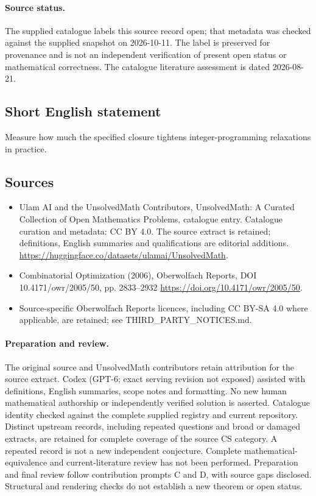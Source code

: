 \documentclass[11pt]{article}
\begin{document}
\paragraph{Source status.}
The supplied catalogue labels this source record open; that metadata was checked against the supplied snapshot on 2026-10-11. The label is preserved for provenance and is not an independent verification of present open status or mathematical correctness. The catalogue literature assessment is dated 2026-08-21.
\subsection{Short English statement}
Measure how much the specified closure tightens integer-programming relaxations in practice.
\subsection{Sources}
\begin{itemize}
\item[S1] Ulam AI and the UnsolvedMath Contributors, UnsolvedMath: A Curated Collection of Open Mathematics Problems, catalogue entry. Catalogue curation and metadata: CC BY 4.0. The source extract is retained; definitions, English summaries and qualifications are editorial additions.
\url{https://huggingface.co/datasets/ulamai/UnsolvedMath}.
\item[S2] Combinatorial Optimization (2006), Oberwolfach Reports, DOI 10.4171/owr/2005/50, pp. 2833--2932
\url{https://doi.org/10.4171/owr/2005/50}.
\item Source-specific Oberwolfach Reports licences, including CC BY-SA 4.0 where applicable, are retained; see THIRD\_PARTY\_NOTICES.md.
\end{itemize}
\paragraph{Preparation and review.}
The original source and UnsolvedMath contributors retain attribution for the source extract. Codex (GPT-6; exact serving revision not exposed) assisted with definitions, English summaries, scope notes and formatting. No new human mathematical authorship or independently verified solution is asserted. Catalogue identity checked against the complete supplied registry and current repository. Distinct upstream records, including repeated questions and broad or damaged extracts, are retained for complete coverage of the source CS category. A repeated record is not a new independent conjecture. Complete mathematical-equivalence and current-literature review has not been performed. Preparation and final review follow contribution prompts C and D, with source gaps disclosed. Structural and rendering checks do not establish a new theorem or open status.
\label{end:statement}
\end{document}
